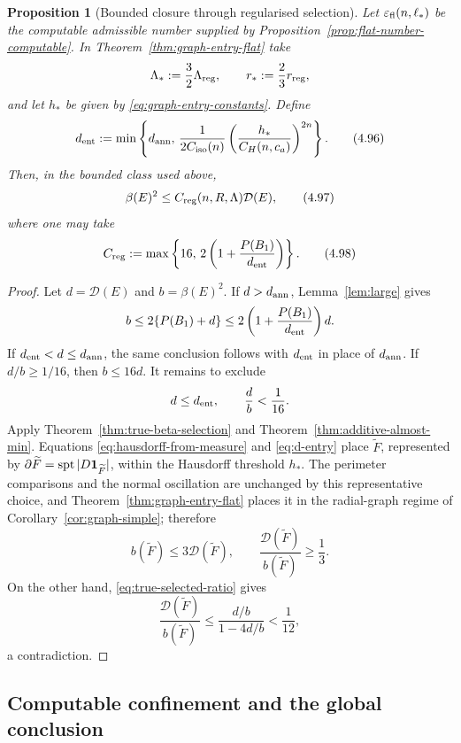 \documentclass[11pt]{amsart}
\newtheorem{proposition}[theorem]{Proposition}
\theoremstyle{definition}
\newcommand{\Per}{P}
\newcommand{\Def}{\mathcal D}
\begin{document}
\begin{proposition}[Bounded closure through regularised selection]
\label{prop:true-beta-bounded-close}
Let \(\varepsilon_{\rm fl}(n,\ell_*)\) be the computable admissible
number supplied by Proposition~\ref{prop:flat-number-computable}.  In
Theorem~\ref{thm:graph-entry-flat} take
\[
   \Lambda_*:=\frac32\Lambda_{\rm reg},\qquad
   r_*:=\frac23r_{\rm reg},
\]
and let \(h_*\) be given by \eqref{eq:graph-entry-constants}.  Define
\[
   d_{\rm ent}:=\min\left\{d_{\rm ann},\,
      \frac{1}{2C_{\rm iso}(n)}
      \left(\frac{h_*}{C_H(n,c_a)}\right)^{2n}\right\}.
\tag{4.96}\label{eq:d-entry}
\]
Then, in the bounded class used above,
\[
   \beta(E)^2\le C_{\rm reg}(n,R,\Lambda)\Def(E),
\tag{4.97}\label{eq:regularised-bounded-FJ}
\]
where one may take
\[
   C_{\rm reg}
   :=
   \max\left\{16,\,
       2\left(1+\frac{\Per(B_1)}{d_{\rm ent}}\right)\right\}.
\tag{4.98}\label{eq:Creg}
\]
\end{proposition}

\begin{proof}
Let \(d=\Def(E)\) and \(b=\beta(E)^2\).  If \(d>d_{\rm ann}\),
Lemma~\ref{lem:large} gives
\[
   b\le2\{\Per(B_1)+d\}
     \le2\left(1+\frac{\Per(B_1)}{d_{\rm ent}}\right)d.
\]
If \(d_{\rm ent}<d\le d_{\rm ann}\), the same conclusion follows with
\(d_{\rm ent}\) in place of \(d_{\rm ann}\).
If \(d/b\ge1/16\), then \(b\le16d\).  It remains to exclude
\[
   d\le d_{\rm ent},\qquad \frac d b<\frac1{16}.
\]
Apply Theorem~\ref{thm:true-beta-selection} and
Theorem~\ref{thm:additive-almost-min}.  Equations
\eqref{eq:hausdorff-from-measure} and \eqref{eq:d-entry} place
\(\widetilde F\), represented by
\(\partial\widetilde F=\operatorname{spt}|D{\bf1}_{\widetilde F}|\),
within the Hausdorff threshold \(h_*\).  The perimeter comparisons and
the normal oscillation are unchanged by this representative choice, and
Theorem~\ref{thm:graph-entry-flat} places it in the radial-graph regime of
Corollary~\ref{cor:graph-simple}; therefore
\[
   b(\widetilde F)\le3\Def(\widetilde F),
   \qquad
   \frac{\Def(\widetilde F)}{b(\widetilde F)}\ge\frac13.
\]
On the other hand, \eqref{eq:true-selected-ratio} gives
\[
   \frac{\Def(\widetilde F)}{b(\widetilde F)}
   \le\frac{d/b}{1-4d/b}<\frac1{12},
\]
a contradiction.
\end{proof}

\subsection{Computable confinement and the global conclusion}
\end{document}
